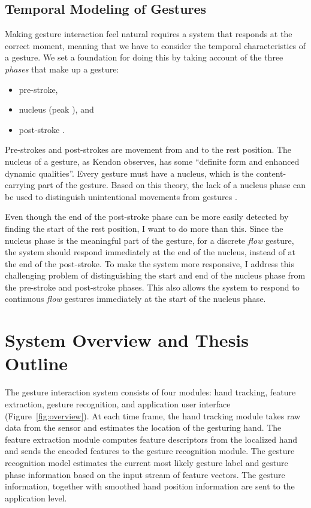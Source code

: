\subsection{Temporal Modeling of Gestures}\label{sec:temporal-model}
Making gesture interaction feel natural requires a system that responds at the
correct moment, meaning that we have to consider the temporal
characteristics of a gesture. We set a foundation for doing this by taking
account of the three \textit{phases} that make up a gesture:
\begin{itemize}
  \item pre-stroke,
  \item nucleus (peak \cite{mcneill82}), and
  \item post-stroke \cite{Pavlovic97}.
\end{itemize}
Pre-strokes and post-strokes are movement from and to the
rest position. The nucleus of a gesture,
as Kendon \cite{kendon86} observes, has some ``definite form and enhanced dynamic
qualities''. Every gesture must have a nucleus, which is the content-carrying
part of the gesture. Based on this theory, the lack of a nucleus phase can
be used to distinguish unintentional movements from gestures .

Even though the end of the
post-stroke phase can be more easily detected by finding the start of the
rest position, I want to do more than this. Since the nucleus phase is the
meaningful part of the gesture, for a discrete \textit{flow} gesture, the
system should respond immediately at the end of the nucleus, instead of at the
end of the post-stroke. To make the system more responsive, I address this challenging problem of distinguishing the start and end of the
 nucleus phase from the pre-stroke and post-stroke phases. This also allows the system to respond to continuous
\textit{flow} gestures immediately at the start of the nucleus phase.

\section{System Overview and Thesis Outline}
The gesture interaction system consists of four modules: hand tracking, 
feature extraction, gesture recognition, and application user interface
(Figure~\ref{fig:overview}). At each time frame, the
hand tracking module takes raw data from the sensor and estimates the location
of the gesturing hand. The feature extraction module computes feature
descriptors from the localized hand and sends the encoded features to the
gesture recognition module.
The gesture recognition model estimates the current most likely gesture label and gesture phase information based on the input stream of
feature vectors. The gesture information, 
together with smoothed hand position information are sent to the application
level. 

